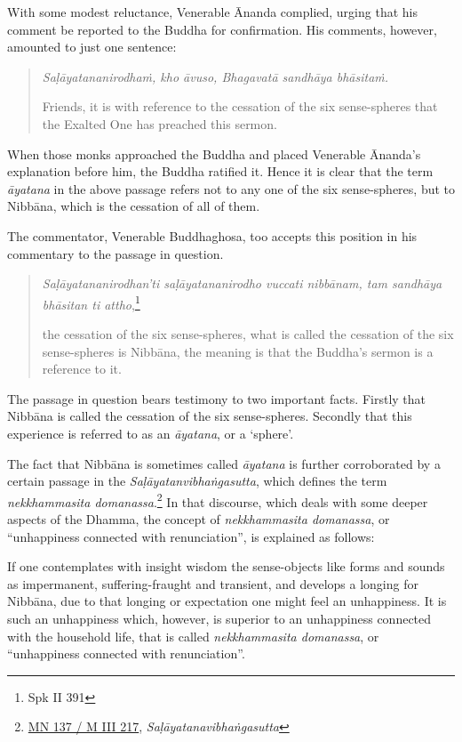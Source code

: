 With some modest reluctance, Venerable Ānanda complied, urging that his comment be reported to the Buddha for confirmation. His comments, however, amounted to just one sentence:

\begin{quote}
\emph{Saḷāyatananirodhaṁ, kho āvuso, Bhagavatā sandhāya bhāsitaṁ.}

Friends, it is with reference to the cessation of the six sense-spheres that the Exalted One has preached this sermon.
\end{quote}

When those monks approached the Buddha and placed Venerable Ānanda's explanation before him, the Buddha ratified it. Hence it is clear that the term \emph{āyatana} in the above passage refers not to any one of the six sense-spheres, but to Nibbāna, which is the cessation of all of them.

The commentator, Venerable Buddhaghosa, too accepts this position in his commentary to the passage in question.

\begin{quote}
\emph{Saḷāyatananirodhan'ti saḷāyatananirodho vuccati nibbānam, tam sandhāya bhāsitan ti attho},\footnote{Spk II 391}

the cessation of the six sense-spheres, what is called the cessation of the six sense-spheres is Nibbāna, the meaning is that the Buddha's sermon is a reference to it.
\end{quote}

The passage in question bears testimony to two important facts. Firstly that Nibbāna is called the cessation of the six sense-spheres. Secondly that this experience is referred to as an \emph{āyatana}, or a `sphere'.

The fact that Nibbāna is sometimes called \emph{āyatana} is further corroborated by a certain passage in the \emph{Saḷāyatanvibhaṅgasutta}, which defines the term \emph{nekkhammasita domanassa}.\footnote{\href{https://suttacentral.net/mn137/pli/ms}{MN 137 / M III 217}, \emph{Saḷāyatanavibhaṅgasutta}} In that discourse, which deals with some deeper aspects of the Dhamma, the concept of \emph{nekkhammasita domanassa}, or ``unhappiness connected with renunciation'', is explained as follows:

If one contemplates with insight wisdom the sense-objects like forms and sounds as impermanent, suffering-fraught and transient, and develops a longing for Nibbāna, due to that longing or expectation one might feel an unhappiness. It is such an unhappiness which, however, is superior to an unhappiness connected with the household life, that is called \emph{nekkhammasita domanassa}, or ``unhappiness connected with renunciation''.

